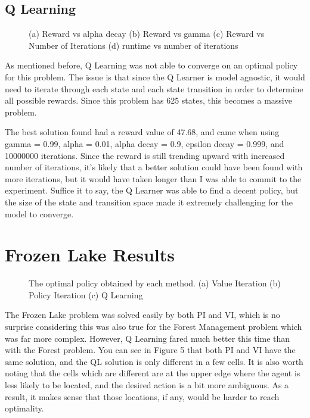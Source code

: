 \documentclass[
	letterpaper, %
]{mlreport}
\begin{document}
\subsection{Q Learning}
\begin{figure}
	\centering
	\caption{(a) Reward vs alpha decay (b) Reward vs gamma (c) Reward vs Number of Iterations (d) runtime vs number of iterations}
	\label{fig:fig4}
\end{figure}
As mentioned before, Q Learning was not able to converge on an optimal policy for this problem. The issue is that since the Q Learner is model agnostic, it would need to iterate through each state and each state transition in order to determine all possible rewards. Since this problem has 625 states, this becomes a massive problem.

The best solution found had a reward value of 47.68, and came when using gamma = 0.99, alpha = 0.01, alpha decay = 0.9, epsilon decay = 0.999, and 10000000 iterations. Since the reward is still trending upward with increased number of iterations, it's likely that a better solution could have been found with more iterations, but it would have taken longer than I was able to commit to the experiment. Suffice it to say, the Q Learner was able to find a decent policy, but the size of the state and transition space made it extremely challenging for the model to converge.

\section{Frozen Lake Results}
\begin{figure}
	\centering
	\caption{The optimal policy obtained by each method. (a) Value Iteration (b) Policy Iteration (c) Q Learning}
	\label{fig:fig5}
\end{figure}
The Frozen Lake problem was solved easily by both PI and VI, which is no surprise considering this was also true for the Forest Management problem which was far more complex. However, Q Learning fared much better this time than with the Forest problem. You can see in Figure 5 that both PI and VI have the same solution, and the QL solution is only different in a few cells. It is also worth noting that the cells which are different are at the upper edge where the agent is less likely to be located, and the desired action is a bit more ambiguous. As a result, it makes sense that those locations, if any, would be harder to reach optimality.
\end{document}
